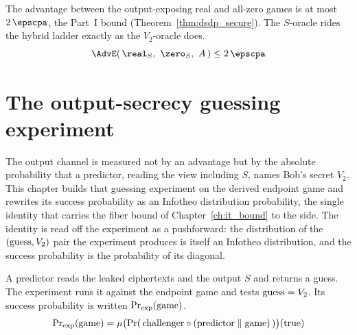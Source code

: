 \begin{lemma}
  \label{lem:dsdp_advantage_derived_leak_S}
  \rocqok
  The advantage between the output-exposing real and all-zero games is at most
  $2\,\epscpa$, the Part~I bound (Theorem~\ref{thm:dsdp_secure}). The $S$-oracle
  rides the hybrid ladder exactly as the $V_2$-oracle does.
  \[ \AdvE(\,\real_S,\ \zero_S,\ A\,) \le 2\,\epscpa \]
\end{lemma}

\chapter{The output-secrecy guessing experiment}
\label{ch:guessing_experiment}

The output channel is measured not by an advantage but by the absolute
probability that a predictor, reading the view including $S$, names Bob's secret
$V_2$. This chapter builds that guessing experiment on the derived endpoint game
and rewrites its success probability as an Infotheo distribution probability,
the single identity that carries the fiber bound of Chapter~\ref{ch:it_bound} to
the \ssprove{} side. The identity is read off the experiment as a pushforward:
the distribution of the $(\mathrm{guess},V_2)$ pair the experiment produces is itself an
Infotheo distribution, and the success probability is the probability of its
diagonal.

\begin{definition}
  \label{def:guessing_experiment_leak_S}
  \rocqok
  A predictor reads the leaked ciphertexts and the output $S$ and returns a
  guess. The experiment runs it against the endpoint game and tests
  $\mathrm{guess} = V_2$. Its success probability is written $\Pr\nolimits_{\mathrm{exp}}(\text{game})$.
  \[ \Pr\nolimits_{\mathrm{exp}}(\text{game})
        = \mu\big(\mathrm{Pr}(\,\text{challenger}\circ
        (\text{predictor}\parallel\text{game})\,)\big)(\mathrm{true}) \]
\end{definition}

